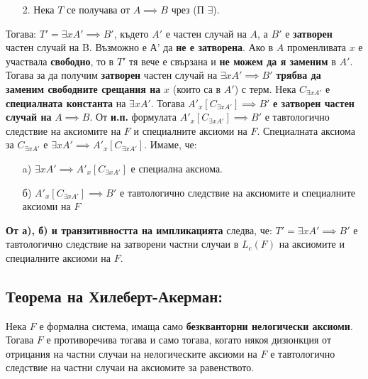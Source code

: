 \documentclass[french]{article}
\begin{document}
\begin{itemize}
	\item[2.] Нека $T$ се получава от $A \implies B$ чрез (П $\exists$).
\end{itemize}	 
	Тогава: $T' = \exists x A' \implies B'$, където $A'$ е частен случай на $A$, а $B'$ е \textbf{затворен} частен случай на B.\newline
	Възможно е А' да \textbf{не е затворена}. Ако в $A$ променливата $x$ е участвала \textbf{свободно}, то в $T'$ тя вече е свързана и \textbf{не можем да я заменим} в $A'$. \newline
	Тогава за да получим \textbf{затворен} частен случай на  $\exists x A' \implies B'$ \textbf{трябва да заменим свободните срещания на } $x$ (които са в $A'$) с терм. \newline
	Нека $C_{\exists x A'}$ е \textbf{специалната константа} на $\exists x A'$. \newline
	Тогава $A'_{x}[C_{\exists x A'}] \implies B'$ \textbf{е затворен частен случай на} $A \implies B$.
	От \textbf{и.п.} формулата $A'_{x}[C_{\exists x A'}] \implies B'$ е тавтологично следствие на аксиомите на $F$ и специалните аксиоми на $F$. \newline
	Специалната аксиома за $C_{\exists x A'}$ е $\exists x A' \implies 
	A'_{x}[C_{\exists x A'}] $.
	Имаме, че: 
	\begin{itemize}
		\item[a)]  $\exists x A' \implies A'_{x}[C_{\exists x A'}]$ е специална аксиома.
		\item[б)] $A'_{x}[C_{\exists x A'}] \implies B'$  е тавтологично следствие на аксиомите и специалните аксиоми на $F$
		
	\end{itemize}
\textbf{От а), б) и транзитивността на импликацията} следва, че: \newline
 $T' = \exists x A' \implies B'$ е тавтологично следствие на затворени частни случаи в $L_c(F)$ на аксиомите и специалните аксиоми на $F$.

\subsection*{Теорема на Хилеберт-Акерман:}
Нека $F$ е формална система, имаща само \textbf{безкванторни нелогически аксиоми}. Тогава $F$ е противоречива тогава и само тогава, когато някоя дизюнкция от отрицания на частни случаи на нелогическите аксиоми на $F$ е тавтологично следствие на частни случаи на аксиомите за равенството.
\end{document}
